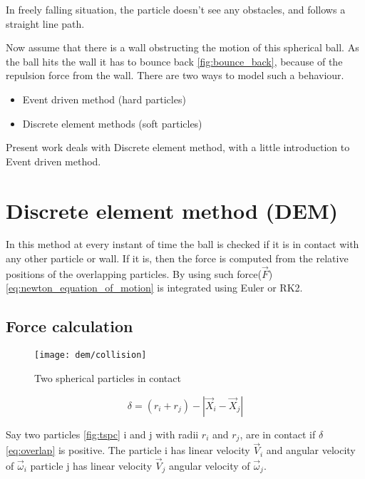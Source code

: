 In freely falling situation, the particle doesn't see any obstacles,
and follows a straight line path.

Now assume that there is a wall obstructing the motion of this
spherical ball.  As the ball hits the wall it has to bounce back
\eqref{fig:bounce_back}, because of the repulsion force from the
wall. There are two ways to model such a behaviour.

\begin{itemize}
\item Event driven method (hard particles)
\item Discrete element methods (soft particles)
\end{itemize}


Present work deals with Discrete element method, with a little introduction
to Event driven method.

\section{Discrete element method (DEM)}
\label{sec:edm}

In this method at every instant of time the ball is checked if it is
in contact with any other particle or wall. If it is, then the force
is computed from the relative positions of the overlapping
particles. By using such force($\vec{F}$) \eqref{eq:newton_equation_of_motion} is
integrated using Euler or RK2.

\subsection{Force calculation}
\label{sec:force}

\begin{figure}
  \centering
  \texttt{[image: dem/collision]}
  \caption{Two spherical particles in contact}
  \label{fig:tspc}
\end{figure}

\begin{equation}
  \label{eq:overlap}
  \delta = (r_i + r_j) - |\vec{X}_{i} - \vec{X}_{j}|
\end{equation}

Say two particles \eqref{fig:tspc} i and j with radii $r_{i}$ and
$r_{j}$, are in contact if $\delta$ \eqref{eq:overlap} is positive.
The particle i has linear velocity $\vec{V}_{i}$ and angular velocity
of $\vec{\omega}_{i}$ particle j has linear velocity $\vec{V}_{j}$ angular
velocity of $\vec{\omega}_{j}$.

